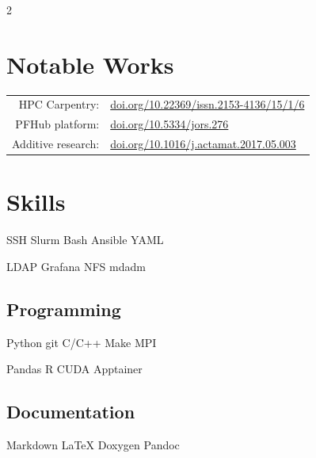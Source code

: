 \documentclass[letterpaper]{plushcv}
\begin{document}
\begin{paracol}{2}
\section{Notable Works}

\begin{tabular}{rl}
HPC Carpentry: & 
  \href{https://doi.org/10.22369/issn.2153-4136/15/1/6}{doi.org/10.22369/issn.2153-4136/15/1/6} \\
PFHub platform: & 
  \href{https://doi.org/10.5334/jors.276}{doi.org/10.5334/jors.276}\\
Additive research: & 
   \href{https://doi.org/10.1016/j.actamat.2017.05.003}{doi.org/10.1016/j.actamat.2017.05.003}\\
\end{tabular}



\switchcolumn[1]



\section{Skills}

\sectionsep{}
SSH \textbullet{} Slurm \textbullet{} Bash \textbullet{} Ansible \textbullet{} YAML\\

\sectionsep{}

LDAP \textbullet{} Grafana \textbullet{} NFS \textbullet{} mdadm \\
\sectionsep{}
\sectionsep{}

\subsection{Programming}
\sectionsep{}
Python \textbullet{} git \textbullet{} C/C++ \textbullet{} Make \textbullet{} MPI\\
\sectionsep{}

Pandas \textbullet{} R \textbullet{} CUDA \textbullet{} Apptainer \\
\sectionsep{}
\sectionsep{}

\subsection{Documentation}
\sectionsep{}
Markdown \textbullet{} \LaTeX{} \textbullet{} Doxygen \textbullet{} Pandoc \\
\sectionsep{}
\sectionsep{}


\end{paracol}
\end{document}
